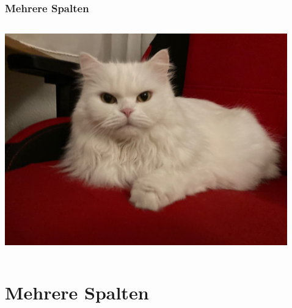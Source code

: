 \documentclass[12pt,ngerman]{beamer}
\begin{document}
\begin{frame}
\frametitle{Mehrere Spalten}

\begin{columns}
\begin{column}{0.33\textwidth}
\includegraphics[width=\textwidth]{Katze}
\end{column}
\begin{column}{0.33\textwidth}
\scriptsize\blindtext
\end{column}
\begin{column}{0.33\textwidth}
\scriptsize\blindtext
\end{column}
\end{columns}

\end{frame}

\section{Mehrere Spalten}
\end{document}
